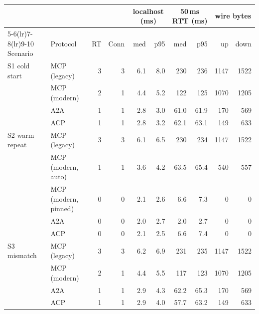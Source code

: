 \begin{tabular}{llrrrrrrrr}
\toprule
 & & & & \multicolumn{2}{c}{localhost (ms)} & \multicolumn{2}{c}{50\,ms RTT (ms)} & \multicolumn{2}{c}{wire bytes} \\
\cmidrule(lr){5-6}\cmidrule(lr){7-8}\cmidrule(lr){9-10}
Scenario & Protocol & RT & Conn & med & p95 & med & p95 & up & down \\
\midrule
S1 cold start & MCP (legacy) & 3 & 3 & 6.1 & 8.0 & 230 & 236 & 1147 & 1522 \\
 & MCP (modern) & 2 & 1 & 4.4 & 5.2 & 122 & 125 & 1070 & 1205 \\
 & A2A & 1 & 1 & 2.8 & 3.0 & 61.0 & 61.9 & 170 & 569 \\
 & ACP & 1 & 1 & 2.8 & 3.2 & 62.1 & 63.1 & 149 & 633 \\
\addlinespace
S2 warm repeat & MCP (legacy) & 3 & 3 & 6.1 & 6.5 & 230 & 234 & 1147 & 1522 \\
 & MCP (modern, auto) & 1 & 1 & 3.6 & 4.2 & 63.5 & 65.4 & 540 & 557 \\
 & MCP (modern, pinned) & 0 & 0 & 2.1 & 2.6 & 6.6 & 7.3 & 0 & 0 \\
 & A2A & 0 & 0 & 2.0 & 2.7 & 2.0 & 2.7 & 0 & 0 \\
 & ACP & 0 & 0 & 2.1 & 2.5 & 6.6 & 7.4 & 0 & 0 \\
\addlinespace
S3 mismatch & MCP (legacy) & 3 & 3 & 6.2 & 6.9 & 231 & 235 & 1147 & 1522 \\
 & MCP (modern) & 2 & 1 & 4.4 & 5.5 & 117 & 123 & 1070 & 1205 \\
 & A2A & 1 & 1 & 2.9 & 4.3 & 62.2 & 65.3 & 170 & 569 \\
 & ACP & 1 & 1 & 2.9 & 4.0 & 57.7 & 63.2 & 149 & 633 \\
\bottomrule
\end{tabular}